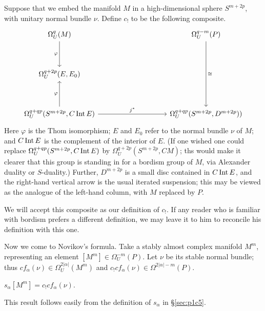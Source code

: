 \documentclass[../main]{subfiles}
\begin{document}
Suppose that we embed the manifold $M$ in a high-dimensional sphere $S^{m+2p}$, with unitary normal bundle $\nu$. Define $c_!$ to be the following composite.
\[
\begin{tikzcd}
\Omega_U^q(M) \arrow[dd, "\varphi"']                                            &  &  &  & \Omega_U^{q-m}(P) \arrow[dddd, "\cong"] \\
                                                                                &  &  &  &                                         \\
{\Omega_U^{q+2p}(E,E_0)}                                                        &  &  &  &                                         \\
                                                                                &  &  &  &                                         \\
{\Omega_U^{q+qp}(S^{m+2p}, C \Int E)} \arrow[uu, "\varphi"] \arrow[rrrr, "j^*"] &  &  &  & {\Omega_U^{q+qp}(S^{m+2p}, D^{m+2p}))} 
\end{tikzcd}
\]
Here $\varphi$ is the Thom isomorphism; $E$ and $E_0$ refer to the normal bundle $\nu$ of $M$; and $C \mathop{\mathrm{Int}} E$ is the complement of the interior of $E$. (If one wished one could replace $\Omega_U^{q+qp}(S^{m+2p}, C \mathop{\mathrm{Int}} E)$ by $\Omega_U^{q+2p}(S^{m+2p}, CM)$; ths would make it clearer that this group is standing in for a bordism group of $M$, via Alexander duality or $S$-duality.) Further, $D^{m+2p}$ is a small disc contained in $C \mathop{\mathrm{Int}} E$, and the right-hand vertical arrow is the usual iterated suspension; this may be viewed as the analogue of the left-hand column, with $M$ replaced by $P$.

We will accept this composite as our definition of $c_!$. If any reader who is familiar with bordism prefers a different definition, we may leave it to him to reconcile his definition with this one.

Now we come to Novikov's formula. Take a stably almost complex manifold $M^m$, representing an element $[M^m] \in \Omega_U^{-m}(P)$. Let $\nu$ be its stable normal bundle; thus $cf_\alpha(\nu) \in \Omega_U^{2|\alpha|}(M^m)$ and $c_! cf_\alpha(\nu) \in \Omega^{2|\alpha|-m}(P)$.

\begin{thm}[Novikov]\label{thm:p1c08.3}
$s_\alpha[M^m] = c_!cf_\alpha(\nu)$.
\end{thm}
This result follows easily from the definition of $s_\alpha$ in \S\ref{sec:p1c5}.
\end{document}
